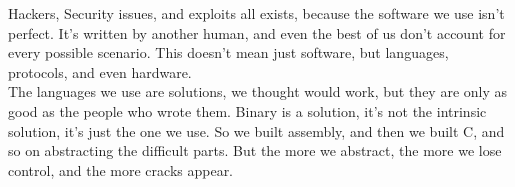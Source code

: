 
Hackers, Security issues, and exploits all exists, because the software
we use isn't perfect. It's written by another human, and even the best of us
don't account for every possible scenario. This doesn't mean just software,
but languages, protocols, and even hardware.\\

The languages we use are solutions, we thought would work, but they are only as
good as the people who wrote them. Binary is a solution, it's not the intrinsic solution,
it's just the one we use. So we built assembly, and then we built C, and so on abstracting the
difficult parts. But the more we abstract, the more we lose control, and the more
cracks appear.\\